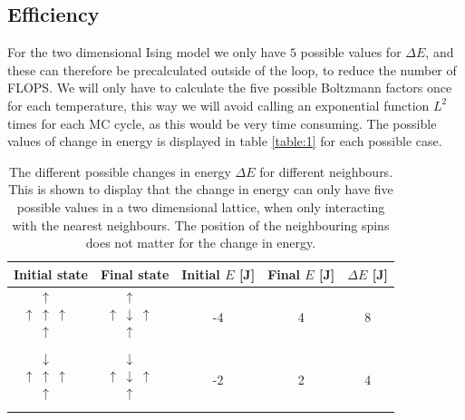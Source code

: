 \documentclass[%
 reprint,
nofootinbib,
aps,
]{revtex4-1}
\begin{document}
\subsection{Efficiency}
For the two dimensional Ising model we only have $5$ possible values for $\Delta E$, and these can therefore be precalculated outside of the loop, to reduce the number of FLOPS. We will only have to calculate the five possible Boltzmann factors once for each temperature, this way we will avoid calling an exponential function $L^2$ times for each MC cycle, as this would be very time consuming. The possible values of change in energy is displayed in table \vref{table:1} for each possible case.

\begin{table}[]
\caption{The different possible changes in energy $\Delta E$ for different neighbours. This is shown to display that the change in energy can only have five possible values in a two dimensional lattice, when only interacting with the nearest neighbours. The position of the neighbouring spins does not matter for the change in energy.}
\label{table:1}
\begin{tabular}{@{}ccccc@{}}
\toprule
Initial state    & Final state        & Initial $E$ [J] & Final $E$ [J] & $\Delta E$ {[}J{]} \\ \midrule
$\begin{matrix}& \uparrow & \\ \uparrow & \uparrow & \uparrow \\ & \uparrow & \\ & & & \end{matrix}$         & $\begin{matrix}& \uparrow & \\ \uparrow & \downarrow & \uparrow \\ & \uparrow & \\ & & & \end{matrix}$ & -4 & 4 &     8                  \\
$\begin{matrix}& \downarrow & \\ \uparrow & \uparrow & \uparrow \\ & \uparrow & \\ & & & \end{matrix}$       & $\begin{matrix}& \downarrow & \\ \uparrow & \downarrow & \uparrow \\ & \uparrow & \\ & & & \end{matrix}$ & -2 &  2    & 4                  \\

\end{tabular}
\end{table}
\end{document}
